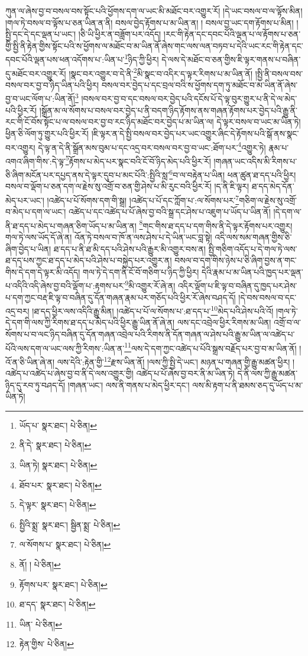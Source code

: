 ཀུན་ལ་ཞེས་བྱ་བ་བསལ་བས་སྟོང་པའི་ཕྱོགས་དག་ལ་ཡང་མི་མཐོང་བར་འགྱུར་རོ། །དེ་ཡང་བསལ་བ་ལ་ལྟོས་མིན། །གལ་ཏེ་བསལ་བ་ལྟོས་པ་ཅན་ཡིན་ན་ནི། བསལ་བྱེད་རྟོགས་པ་མ་ཡིན་ན། །
བསལ་བྱ་ཡང་དག་རྟོགས་པ་མིན། །སྤྱི་དང་དེ་དང་ལྡན་པ་ཡང་། །ཅི་ཡི་ཕྱིར་ན་བཟློག་པར་འདོད། །རང་གི་རྟེན་དང་དབང་པོའི་ལྡན་པ་ལ་རྟོགས་པ་ཅན་གྱི་སྤྱི་ནི་རྟེན་གྱིས་སྟོང་པའི་ས་ཕྱོགས་ལ་མཐོང་བ་མ་ཡིན་ནོ་ཞེས་གང་ལས་ལན་བཏབ་པ་དེའི་ཡང་རང་གི་རྟེན་དང་དབང་པོའི་ལྡན་པས་ཕན་འདོགས་པ་:ཡིན་པ་\footnote{ཡོད་པ་  སྣར་ཐང་།  པེ་ཅིན། }ཉིད་ཀྱི་ཕྱིར། དེ་ལས་དེ་མཐོང་བ་ཅན་གྱིས་ཇི་ལྟར་གནས་པ་བཞིན་དུ་མཐོང་བར་འགྱུར་རོ། །སྣང་བར་འགྱུར་བ་དེ་ནི་\footnote{ནི་དེ་  སྣར་ཐང་།  པེ་ཅིན། }མི་སྣང་བ་འདིར་ད་ལྟར་རིགས་པ་མ་ཡིན་ནོ། །སྤྱི་ནི་བསལ་བས་བསལ་བར་བྱ་བ་ཉིད་ཡིན་པའི་ཕྱིར། བསལ་བར་བྱེད་པ་དང་བྲལ་བའི་ས་ཕྱོགས་དག་ཏུ་མཐོང་བ་མ་ཡིན་ནོ་ཞེས་བྱ་བ་ཡང་ལོག་པ་:ཡིན་ནོ།\footnote{ཡིན་ཏེ།  སྣར་ཐང་།  པེ་ཅིན། } །བསལ་བར་བྱ་བ་དང་བསལ་བར་བྱེད་པའི་དངོས་པོ་དེ་ལྟ་བུར་གྱུར་པ་ནི་དེ་ལ་མེད་པའི་ཕྱིར་རོ། །སྒྲོན་མ་ལ་སོགས་པ་བསལ་བར་བྱེད་པ་ནི་བདག་ཉིད་རྟོགས་ནས་གཞན་རྟོགས་པར་བྱེད་པའི་རྒྱུ་ནི་རང་གི་ངོ་བོས་སྟོང་པ་ལ་བསལ་བར་བྱ་བ་རང་ཉིད་མཐོང་བར་བྱེད་པ་མ་ཡིན་ལ། དེ་ལྟར་བསལ་བ་ཡང་མ་ཡིན་ཏེ། ཕྱིན་ཅི་ལོག་ཏུ་གྱུར་པའི་ཕྱིར་རོ། །ཇི་ལྟར་ན་དེ་སྤྱི་བསལ་བར་བྱེད་པར་ཡང་འགྱུར་ཞིང་དེ་རྟོགས་པའི་སྒོ་ནས་སྣང་བར་འགྱུར། དེ་ལྟ་ན་དེ་ནི་སྒྲོན་མས་བུམ་པ་དང་འདྲ་བར་བསལ་བར་བྱ་བ་ཡང་:ཐོག་པར་\footnote{ཐོབ་པར་  སྣར་ཐང་།  པེ་ཅིན། }འགྱུར་ཏེ། རྣམ་པ་འགའ་ཞིག་གིས་:དེ་ལྟ་\footnote{དེ་ལྟར་  སྣར་ཐང་།  པེ་ཅིན། }རྟོགས་པ་མེད་པར་སྣང་བའི་ངོ་བོ་ཉིད་མེད་པའི་ཕྱིར་རོ། །གཞན་ཡང་འདིས་མི་རིགས་པ་ཅི་ཞིག་མངོན་པར་དཔྱད་ནས་དེ་ལྟར་དུབ་པ་མང་པོའི་:སྤྱིའི་སླ་\footnote{སྤྱིའི་སྨྲ་  སྣར་ཐང་། སྦྱིན་སྨྲ་  པེ་ཅིན། }བ་ལ་བརྟེན་པ་ཡིན། ཕན་ཚུན་ཐ་དད་པའི་ཕྱིར། བསལ་བ་ལྡོག་པ་ཅན་དག་ལ་རྗེས་སུ་འགྲོ་བ་ཅན་གྱི་ཤེས་པ་མི་རུང་བའི་ཕྱིར་རོ། །ད་ནི་ཇི་ལྟར། ཐ་དད་མེད་དོན་མེད་པར་ཡང་། །འཚེད་པ་པོ་སོགས་དག་གི་སྒྲ། །འཚེད་པ་པོ་དང་ཀློག་པ་:ལ་སོགས་པར་\footnote{ལ་སོགས་པ་  སྣར་ཐང་།  པེ་ཅིན། }གཅིག་ལ་རྗེས་སུ་འགྲོ་བ་མེད་པ་དག་ལ་ཡང་། འཚེད་པ་དང་འཚེད་པ་པོ་ཞེས་བྱ་བའི་སྒྲ་དང་ཤེས་པ་འཇུག་པ་ཡོད་པ་ཡིན་ནོ། །དེ་དག་ལ་ནི་ཐ་དད་པ་མེད་པ་གཞན་ཅིག་ཡོད་པ་མ་ཡིན་ན། \footnote{ནོ། །   པེ་ཅིན། }གང་གིས་ཐ་དད་པ་དག་གིས་ནི་དེ་ལྟར་རྟོགས་པར་འགྱུར། གལ་ཏེ་ལས་ཡོད་དོ་ཞེ་ན། འོན་ཏེ་བསལ་བ་ཁོ་ན་ལས་ཤེས་པ་དེ་ཡིན་ཡང་བླ་སྟེ། འདི་ལས་སམ་གཞན་གྱིས་ཅི་ཞིག་བྱེད་པ་ཡིན། ཐ་དད་པ་ནི་ཐ་མི་དད་པའི་ཤེས་པའི་རྒྱུར་མི་འགྱུར་བས་ན། སྤྱི་གཅིག་འདོད་པ་དེ་གལ་ཏེ་ལས་ཐ་དད་པས་ཀྱང་ཐ་དད་པ་མེད་པའི་ཤེས་པ་བསྐྱེད་པར་འགྱུར་ན། བསལ་བ་དག་གིས་ཉེས་པ་ཅི་ཞིག་བྱས་ན་གང་གིས་དེ་དག་དེ་ལྟར་མི་འདོད། གལ་ཏེ་དེ་དག་ནི་ངོ་བོ་གཅིག་པ་ཉིད་ཀྱི་ཕྱིར། དེའི་རྣམ་པ་མ་ཡིན་པའི་ཁྱད་པར་ལྡན་པ་འདིའི་འདི་ཞེས་བྱ་བའི་ལྡོག་པ་:རྟགས་པར་\footnote{རྟོགས་པར་  སྣར་ཐང་།  པེ་ཅིན། }མི་འགྱུར་རོ་ཞེ་ན། འདིར་ལྡོག་པ་ཇི་ལྟ་བ་བཞིན་དུ་ཁྱད་པར་ཤེས་པ་དག་ཀྱང་བརྡ་ཇི་ལྟ་བ་བཞིན་དུ་དོན་གཞན་རྣམ་པར་གཅོད་པའི་ཕྱིར་རོ་ཞེས་བཤད་དོ། །དེ་བས་བསལ་བ་དང་འདྲ་བར། །ཐ་དད་ཕྱིར་ལས་འདིའི་རྒྱུ་མིན། །འཚེད་པ་པོ་ལ་སོགས་པ་:ཐ་དད་པ་\footnote{ཐ་དད་  སྣར་ཐང་།  པེ་ཅིན། }མེད་པའི་ཤེས་པའི་འོ། །གལ་ཏེ་དེ་དག་གི་ལས་ཀྱི་རིགས་ཐ་དད་པ་མེད་པའི་ཕྱིར་རྒྱུ་ཡིན་ནོ་ཞེ་ན། ལས་དང་འབྲེལ་ཕྱིར་རིགས་མ་ཡིན། འགྲོ་བ་ལ་སོགས་པ་བ་ལང་ཉིད་བཞིན་དུ་དོན་གཞན་འབྲེལ་པའི་རིགས་ནི་དོན་གཞན་ལ་ཤེས་པའི་རྒྱུ་མ་ཡིན་ལ་འཚེད་པ་པོའི་ལས་དག་ལ་ཡང་ལས་ཀྱི་རིགས་:ཡིན་ན་\footnote{ཡིན་  པེ་ཅིན། }ལས་དེ་དག་ཀྱང་འཚེད་པ་པོའི་སྒྲས་བརྗོད་པར་བྱ་བ་མ་ཡིན་ནོ། །འོ་ན་ཅི་ཡིན་ཞེ་ན། ལས་དེའི་:རྟེན་གྱི་\footnote{རྟེན་གྱིས་  པེ་ཅིན། }རྫས་ཡིན་ནོ། །ལས་ཀྱི་སྤྱི་དེ་ཡང་། མཉན་པ་གཞན་གྱི་རྒྱུ་མཚན་ཕྱིར། །འཚེད་པ་འཚེད་པ་ཞེས་བྱ་བ་ནི་དེ་ལས་འགྱུར་གྱི། འཚེད་པ་པོ་ཞེས་བྱ་བར་ནི་མ་ཡིན་ཏེ། དེ་ནི་ལས་ཀྱི་རྒྱུ་མཚན་ཉིད་དུ་རབ་ཏུ་བཤད་དོ། །གཞན་ཡང་། ལས་ནི་གནས་པ་མེད་ཕྱིར་དང་། ལས་མི་རྟག་པ་ནི་ཐམས་ཅད་དུ་ཡོད་པ་མ་ཡིན་ཏེ། 
